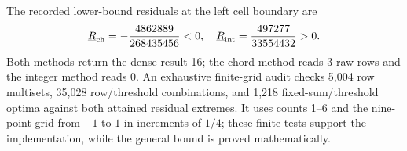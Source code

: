 The recorded lower-bound residuals at the left cell boundary are
\begin{equation}
\underline R_{\rm ch}=-\frac{4862889}{268435456}<0,\quad \underline R_{\rm int}=\frac{497277}{33554432}>0.
\end{equation}
Both methods return the dense result 16; the chord method reads 3 raw rows and the integer method reads 0. An exhaustive finite-grid audit checks 5,004 row multisets, 35,028 row/threshold combinations, and 1,218 fixed-sum/threshold optima against both attained residual extremes. It uses counts 1--6 and the nine-point grid from $-1$ to $1$ in increments of $1/4$; these finite tests support the implementation, while the general bound is proved mathematically.
